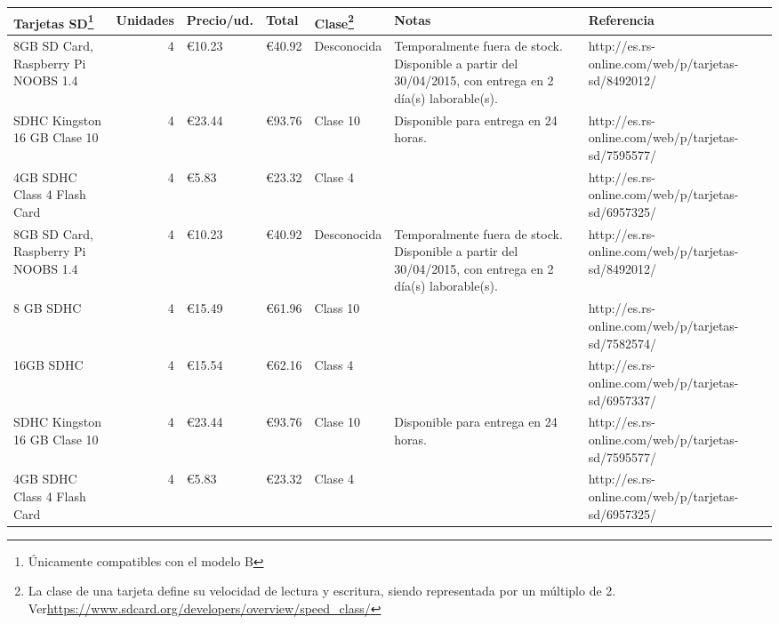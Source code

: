 \begin{landscape}
\begin{table}
\begin{tabular}{|l|r|l|l|l|p{3.5cm}|p{4.5cm}|}
\hline
Tarjetas SD\footnote{Únicamente compatibles con el modelo B}&Unidades&Precio/ud.&Total&Clase\footnote{La clase de una tarjeta define su velocidad de lectura y escritura, siendo representada por un múltiplo de 2. Ver\href{https://www.sdcard.org/developers/overview/speed_class/}{https://www.sdcard.org/developers/overview/speed\_class/}}&Notas&Referencia\\
\hline
8GB SD Card, Raspberry Pi NOOBS 1.4&4&€10.23&€40.92&Desconocida&Temporalmente fuera de stock. Disponible a partir del 30/04/2015, con entrega en 2 día(s) laborable(s).&http://es.rs-online.com/web/p/tarjetas-sd/8492012/\\
\hline
SDHC Kingston 16 GB Clase 10&4&€23.44&€93.76&Clase 10&Disponible para entrega en 24 horas.&http://es.rs-online.com/web/p/tarjetas-sd/7595577/\\
\hline
4GB SDHC Class 4 Flash Card&4&€5.83&€23.32&Clase 4&&http://es.rs-online.com/web/p/tarjetas-sd/6957325/\\
\hline
8GB SD Card, Raspberry Pi NOOBS 1.4&4&€10.23&€40.92&Desconocida&Temporalmente fuera de stock. Disponible a partir del 30/04/2015, con entrega en 2 día(s) laborable(s).&http://es.rs-online.com/web/p/tarjetas-sd/8492012/\\
\hline
8 GB SDHC&4&€15.49&€61.96&Class 10&&http://es.rs-online.com/web/p/tarjetas-sd/7582574/\\
\hline
16GB SDHC&4&€15.54&€62.16&Class 4&&http://es.rs-online.com/web/p/tarjetas-sd/6957337/\\
\hline
SDHC Kingston 16 GB Clase 10&4&€23.44&€93.76&Clase 10&Disponible para entrega en 24 horas.&http://es.rs-online.com/web/p/tarjetas-sd/7595577/\\
\hline
4GB SDHC Class 4 Flash Card&4&€5.83&€23.32&Clase 4&&http://es.rs-online.com/web/p/tarjetas-sd/6957325/\\
\hline
\end{tabular}
\newline
\end{table}
\end{landscape}
